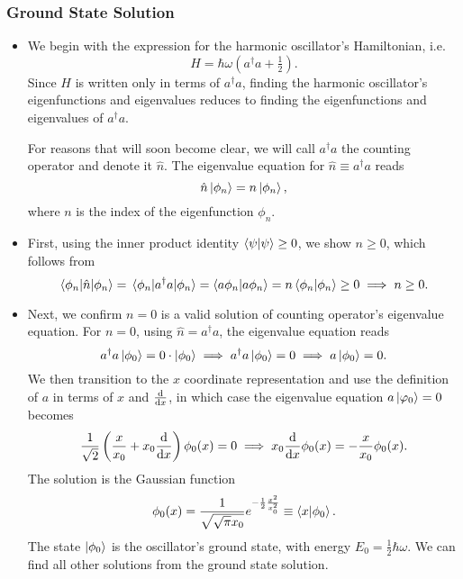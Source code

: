 \documentclass[11pt, a4paper]{article}
\renewcommand{\k}[1]{\ket{#1}}
\begin{document}
\subsubsection{Ground State Solution}
\begin{itemize}
    \item We begin with the expression for the harmonic oscillator's Hamiltonian, i.e.
    \begin{equation*}
        H = \hbar \omega \left( a^{\dagger}a + \tfrac{1}{2} \right).
    \end{equation*}
    Since $ H $ is written only in terms of $ a^{\dagger}a $, finding the harmonic oscillator's eigenfunctions and eigenvalues reduces to finding the eigenfunctions and eigenvalues of $ a^{\dagger}a $.

    For reasons that will soon become clear, we will call $ a^{\dagger}a $ the counting operator and denote it $ \hat{n} $. The eigenvalue equation for $ \hat{n} \equiv a^{\dagger}a $ reads
	\begin{equation*}
		\hat{n}\k{\phi_{n}} = n \ket{\phi_{n}},
	\end{equation*}
    where $ n $ is the index of the eigenfunction $ \phi_{n} $.
    
    \item First, using the inner product identity $ \braket{\psi}{\psi} \geq 0 $, we show $ n \geq 0 $, which follows from
	\begin{equation*}
		\mel{\phi_{n}}{\hat{n}}{\phi_{n}} = \mel{\phi_{n}}{a^{\dagger}a}{\phi_{n}} = \braket{a \phi_{n}}{a \phi_{n}} = n \braket{\phi_{n}}{\phi_{n}} \geq 0 \implies n \geq 0.
	\end{equation*}

    \item Next, we confirm $ n = 0 $ is a valid solution of counting operator's eigenvalue equation. For $ n = 0 $, using $ \hat{n} = a^{\dagger}a $, the eigenvalue equation reads
	\begin{equation*}
        a^{\dagger}a \ket{\phi_{0}} = 0 \cdot \ket{\phi_{0}} \implies a^{\dagger}a \ket{\phi_{0}} = 0 \implies a \ket{\phi_{0}} = 0.
	\end{equation*}
    We then transition to the $ x $ coordinate representation and use the definition of $ a $ in terms of $ x $ and $ \dv{x} $, in which case the eigenvalue equation $ a \ket{\varphi_{0}} = 0 $ becomes
	\begin{equation*}
		\frac{1}{\sqrt{2}}\left(\frac{x}{x_{0}} + x_{0} \dv{x}\right)\phi_{0}(x) = 0 \implies x_{0} \dv{x} \phi_{0}(x) = - \frac{x}{x_{0}}\phi_{0}(x).
	\end{equation*}
	The solution is the Gaussian function
	\begin{equation*}
		\phi_{0}(x) = \frac{1}{\sqrt{\sqrt{\pi}x_{0}}}e^{-\frac{1}{2}\frac{x^{2}}{x_{0}^{2}}} \equiv \braket{x}{\phi_{0}}.
	\end{equation*}
	The state $ \k{\phi_{0}} $ is the oscillator's ground state, with energy $ E_{0} = \frac{1}{2}\hbar \omega $. We can find all other solutions from the ground state solution. 


\end{itemize}
\end{document}
